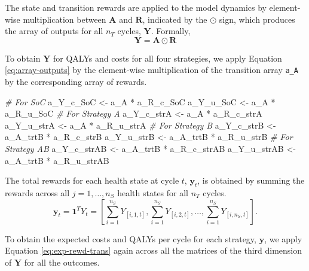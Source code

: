 \documentclass[
]{article}
\newenvironment{Shaded}{\begin{snugshade}}{\end{snugshade}}
\newcommand{\CommentTok}[1]{\textcolor[rgb]{0.56,0.35,0.01}{\textit{#1}}}
\newcommand{\NormalTok}[1]{#1}
\newcommand{\OtherTok}[1]{\textcolor[rgb]{0.56,0.35,0.01}{#1}}
\newcommand{\SpecialCharTok}[1]{\textcolor[rgb]{0.00,0.00,0.00}{#1}}
\begin{document}
The state and transition rewards are applied to the model dynamics by element-wise multiplication between \(\mathbf{A}\) and \(\mathbf{R}\), indicated by the \(\odot\) sign, which produces the array of outputs for all \(n_T\) cycles, \(\mathbf{Y}\). Formally,
\begin{equation}
  \mathbf{Y} = \mathbf{A} \odot \mathbf{R}
  \label{eq:array-outputs}
\end{equation}

To obtain \(\mathbf{Y}\) for QALYs and costs for all four strategies, we apply Equation \eqref{eq:array-outputs} by the element-wise multiplication of the transition array \texttt{a\_A} by the corresponding array of rewards.

\begin{Shaded}
\begin{Highlighting}[]
\CommentTok{\# For SoC}
\NormalTok{a\_Y\_c\_SoC }\OtherTok{\textless{}{-}}\NormalTok{ a\_A }\SpecialCharTok{*}\NormalTok{ a\_R\_c\_SoC}
\NormalTok{a\_Y\_u\_SoC }\OtherTok{\textless{}{-}}\NormalTok{ a\_A }\SpecialCharTok{*}\NormalTok{ a\_R\_u\_SoC}
\CommentTok{\# For Strategy A}
\NormalTok{a\_Y\_c\_strA }\OtherTok{\textless{}{-}}\NormalTok{ a\_A }\SpecialCharTok{*}\NormalTok{ a\_R\_c\_strA}
\NormalTok{a\_Y\_u\_strA }\OtherTok{\textless{}{-}}\NormalTok{ a\_A }\SpecialCharTok{*}\NormalTok{ a\_R\_u\_strA}
\CommentTok{\# For Strategy B}
\NormalTok{a\_Y\_c\_strB }\OtherTok{\textless{}{-}}\NormalTok{ a\_A\_trtB }\SpecialCharTok{*}\NormalTok{ a\_R\_c\_strB}
\NormalTok{a\_Y\_u\_strB }\OtherTok{\textless{}{-}}\NormalTok{ a\_A\_trtB }\SpecialCharTok{*}\NormalTok{ a\_R\_u\_strB}
\CommentTok{\# For Strategy AB}
\NormalTok{a\_Y\_c\_strAB }\OtherTok{\textless{}{-}}\NormalTok{ a\_A\_trtB }\SpecialCharTok{*}\NormalTok{ a\_R\_c\_strAB}
\NormalTok{a\_Y\_u\_strAB }\OtherTok{\textless{}{-}}\NormalTok{ a\_A\_trtB }\SpecialCharTok{*}\NormalTok{ a\_R\_u\_strAB}
\end{Highlighting}
\end{Shaded}

The total rewards for each health state at cycle \(t\), \(\mathbf{y}_t\), is obtained by summing the rewards across all \(j = 1,\ldots, n_S\) health states for all \(n_T\) cycles.
\begin{equation}
  \mathbf{y}_t = \mathbf{1}^T Y_t = \left[\sum_{i=1}^{n_S}{Y_{[i,1,t]}}, \sum_{i=1}^{n_S}{Y_{[i,2,t]}}, \dots , \sum_{i=1}^{n_S}{Y_{[i,n_S,t]}}\right].
  \label{eq:exp-rewd-trans}
\end{equation}

To obtain the expected costs and QALYs per cycle for each strategy, \(\mathbf{y}\), we apply Equation \eqref{eq:exp-rewd-trans} again across all the matrices of the third dimension of \(\mathbf{Y}\) for all the outcomes.
\end{document}
